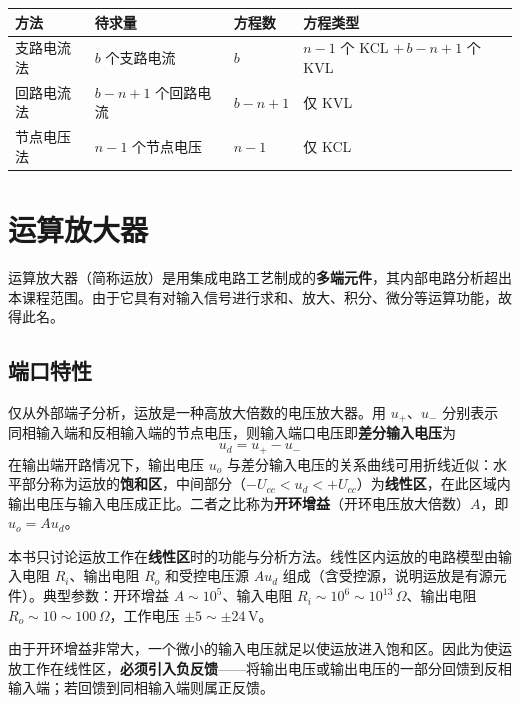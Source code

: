 
\begin{center}
\begin{tabular}{@{}llll@{}}
\toprule
方法 & 待求量 & 方程数 & 方程类型 \\
\midrule
支路电流法 & $b$ 个支路电流 & $b$ & $n-1$ 个 KCL $+\,b-n+1$ 个 KVL \\
回路电流法 & $b-n+1$ 个回路电流 & $b-n+1$ & 仅 KVL \\
节点电压法 & $n-1$ 个节点电压 & $n-1$ & 仅 KCL \\
\bottomrule
\end{tabular}
\end{center}

\section{运算放大器}
运算放大器（简称运放）是用集成电路工艺制成的\textbf{多端元件}，其内部电路分析超出本课程范围。由于它具有对输入信号进行求和、放大、积分、微分等运算功能，故得此名。

\subsection{端口特性}
仅从外部端子分析，运放是一种高放大倍数的电压放大器。用 $u_+$、$u_-$ 分别表示同相输入端和反相输入端的节点电压，则输入端口电压即\textbf{差分输入电压}为
\begin{equation}
u_d=u_+-u_-
\end{equation}
在输出端开路情况下，输出电压 $u_o$ 与差分输入电压的关系曲线可用折线近似：水平部分称为运放的\textbf{饱和区}，中间部分（$-U_{cc}<u_d<+U_{cc}$）为\textbf{线性区}，在此区域内输出电压与输入电压成正比。二者之比称为\textbf{开环增益}（开环电压放大倍数）$A$，即 $u_o=Au_d$。

本书只讨论运放工作在\textbf{线性区}时的功能与分析方法。线性区内运放的电路模型由输入电阻 $R_i$、输出电阻 $R_o$ 和受控电压源 $Au_d$ 组成（含受控源，说明运放是有源元件）。典型参数：开环增益 $A\sim10^{5}$、输入电阻 $R_i\sim10^{6}\sim10^{13}\,\Omega$、输出电阻 $R_o\sim10\sim100\,\Omega$，工作电压 $\pm5\sim\pm24\,\mathrm{V}$。

由于开环增益非常大，一个微小的输入电压就足以使运放进入饱和区。因此为使运放工作在线性区，\textbf{必须引入负反馈}——将输出电压或输出电压的一部分回馈到反相输入端；若回馈到同相输入端则属正反馈。

